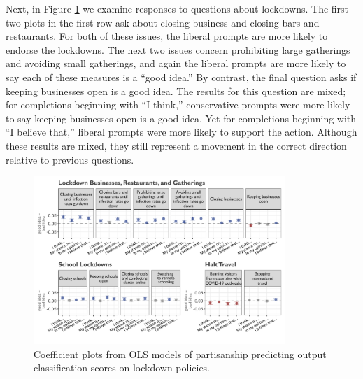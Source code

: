 \documentclass{article}
\begin{document}
Next, in Figure \ref{fig:partisan3} we examine responses to questions about lockdowns. The
first two plots in the first row ask about closing business and closing
bars and restaurants. For both of these issues, the liberal prompts are
more likely to endorse the lockdowns. The next two issues concern
prohibiting large gatherings and avoiding small gatherings, and again
the liberal prompts are more likely to say each of these measures is a
``good idea.'' By contrast, the final question asks if keeping
businesses open is a good idea. The results for this question are mixed;
for completions beginning with ``I think,'' conservative prompts were
more likely to say keeping businesses open is a good idea. Yet for
completions beginning with ``I believe that,'' liberal prompts were more
likely to support the action. Although these results are mixed, they
still represent a movement in the correct direction relative to previous
questions.

\begin{figure}[!htbp]
  \captionsetup{justification=raggedright,singlelinecheck=false}
  \caption{Coefficient plots from OLS models of partisanship predicting output classification scores on lockdown policies.}
  \label{fig:partisan3}
  \centering
\includegraphics[width=0.85\textwidth]{./figures/media/image14.png}
\end{figure}
\end{document}
